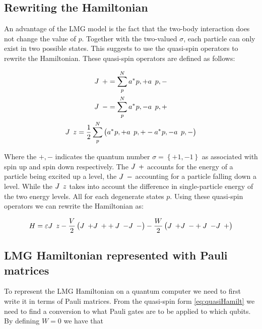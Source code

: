 \subsection{Rewriting the Hamiltonian}

An advantage of the LMG model is the fact that the two-body interaction does not change the value of $p$. Together with the two-valued $\sigma$, each particle can only exist in two possible states. This suggests to use the quasi-spin operators to rewrite the Hamiltonian. These quasi-spin operators are defined as follows:

\begin{equation} \label{eq:quasispin}
\begin{gathered}
    \op{J}{+} = \sum_p^N \hc{a}{p, +}\op{a}{p,-} \\
    \op{J}{-} = \sum_p^N \hc{a}{p, -}\op{a}{p,+} \\
    \op{J}{z} = \frac{1}{2}\sum_p^N\left(\hc{a}{p,+} \op{a}{p,+} -  \hc{a}{p,-} \op{a}{p,-} \right )
\end{gathered}   
\end{equation}


Where the $+, -$ indicates the quantum number $\sigma = \left \{ +1, -1\right \}$ as associated with spin up and spin down respectively. The $\op{J}{+}$ accounts for the energy of a particle being excited up a level, the $\op{J}{-}$ accounting for a particle falling down a level. While the $\op{J}{z}$ takes into account the difference in single-particle energy of the two energy levels. All for each degenerate states $p$. Using these quasi-spin operators we can rewrite the Hamiltonian as:

\begin{equation}\label{eq:quasiHamilt}
    H = \varepsilon \op{J}{z} - \frac{V}{2} \left ( \op{J}{+}\op{J}{+}  + \op{J}{-}\op{J}{-} \right ) - \frac{W}{2} \left (\op{J}{+} \op{J}{-} + \op{J}{-}\op{J}{+} \right )
\end{equation}

\subsection{LMG Hamiltonian represented with Pauli matrices}

To represent the LMG Hamiltonian on a quantum computer we need to first write it in terms of Pauli matrices. From the quasi-spin form \ref{eq:quasiHamilt} we need to find a conversion to what Pauli gates are to be applied to which qubits. By defining $W = 0$ we have that

